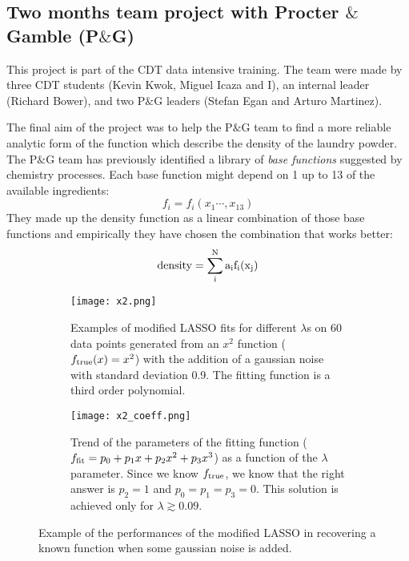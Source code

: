 \documentclass[letterpaper]{article}
\newcommand{\peg}{P$\&$G }
\begin{document}
\subsection{Two months team project with Procter $\&$ Gamble (P$\&$G)}
\label{sub:peg}

This project is part of the CDT data intensive training. The team were made by three CDT students (Kevin Kwok, Miguel Icaza and I), an internal leader (Richard Bower), and two \peg leaders (Stefan Egan and Arturo Martinez).

The final aim of the project was to help the P$\&$G team to find a more reliable analytic form of the function which describe the density of the laundry powder. The \peg team has previously identified a library of \textit{base functions} suggested by chemistry processes. Each base function might depend on 1 up to 13 of the available ingredients: 
\begin{equation}
\label{eq:fi}
f_i = f_i(x_1 \cdots, x_{13})
\end{equation}
They made up the density function as a linear combination of those base functions and empirically they have chosen the combination that works better: 
\begin{equation}
\label{eq:density}
\rm{density} = \sum_i^N a_i f_i(x_j)
\end{equation}


%
\begin{figure}
\centering
\begin{subfigure}{.48\textwidth}
   \centering
   \texttt{[image: x2.png]}
   \caption{Examples of modified LASSO fits for different $\lambda$s on 60 data points generated from an $x^2$ function ($f_{\rm{true}}(x)=x^2$) with the addition of a gaussian noise with standard deviation 0.9. The fitting function is a third order polynomial.}
   \label{fig:x2}
\end{subfigure}\hfill%
\begin{subfigure}{.48\textwidth}
   \centering
   \texttt{[image: x2\_coeff.png]}
   \caption{Trend of the parameters of the fitting function ($f_{\rm{fit}}=p_0 + p_1 x + p_2 x^2 + p_3 x^3$) as a function of the $\lambda$ parameter. Since we know $f_{\rm{true}}$, we know that the right answer is $p_2=1$ and $p_0=p_1=p_3 =0$. This solution is achieved only for $\lambda \gtrsim 0.09$.}
   \label{fig:x2_coeff}
\end{subfigure}
\caption{Example of the performances of the modified LASSO in recovering a known function when some gaussian noise is added.}
\label{fig:LASSO}
\end{figure}
%
\end{document}
